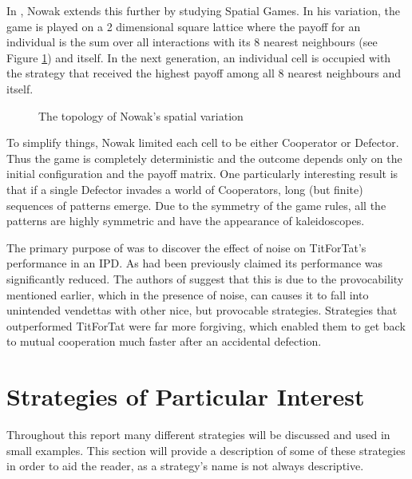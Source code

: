 In \cite{Nowak1992, Nowak1993, Nowak1994}, Nowak extends this further by studying Spatial Games.
In his variation, the game is played on a 2 dimensional square lattice where the payoff for an individual is the sum over all interactions with its 8 nearest neighbours (see Figure \ref{fig:nowak_spatial}) and itself.
In the next generation, an individual cell is occupied with the strategy that received the highest payoff among all 8 nearest neighbours and itself.

\begin{figure}[hbtp!]
    \centering
    \caption{The topology of Nowak's spatial variation}
    \label{fig:nowak_spatial}
\end{figure}

To simplify things, Nowak limited each cell to be either Cooperator or Defector.
Thus the game is completely deterministic and the outcome depends only on the initial configuration and the payoff matrix.
One particularly interesting result is that if a single Defector invades a world of Cooperators, long (but finite) sequences of patterns emerge.
Due to the symmetry of the game rules, all the patterns are highly symmetric and have the appearance of kaleidoscopes.

The primary purpose of \cite{Bendor1991} was to discover the effect of noise on TitForTat's performance in an IPD.
As had been previously claimed its performance was significantly reduced.
The authors of \cite{Bendor1991} suggest that this is due to the provocability mentioned earlier, which in the presence of noise, can causes it to fall into unintended vendettas with other nice, but provocable strategies.
Strategies that outperformed TitForTat were far more forgiving, which enabled them to get back to mutual cooperation much faster after an accidental defection.



\section{Strategies of Particular Interest}\label{sec:individual_strategies}
Throughout this report many different strategies will be discussed and used in small examples.
This section will provide a description of some of these strategies in order to aid the reader, as a strategy's name is not always descriptive.



